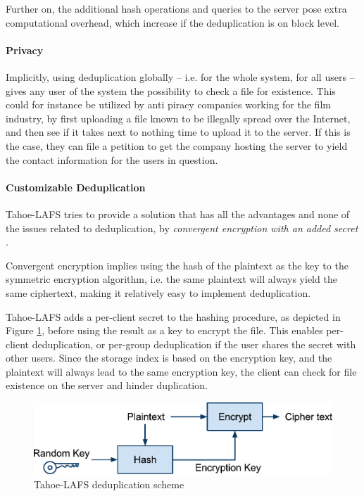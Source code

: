\documentclass[pdftex,english,10pt,b5paper,twoside]{book}
\begin{document}
Further on, the additional hash operations and queries to the server pose
extra computational overhead, which increase if the deduplication is on block
level.

\paragraph{Privacy} Implicitly, using deduplication globally -- i.e. for the
whole system, for all users -- gives any user of the system the possibility to
check a file for existence. This could for instance be utilized by anti piracy
companies working for the film industry, by first uploading a file known to be
illegally spread over the Internet, and then see if it takes next to nothing
time to upload it to the server. If this is the case, they can file a petition
to get the company hosting the server to yield the contact information for the
users in question.

\paragraph{Customizable Deduplication} Tahoe-\ac{LAFS} tries to provide a
solution that has all the advantages and none of the issues related to
deduplication, by \emph{convergent encryption with an added secret}
\cite{tahoe}.

Convergent encryption implies using the hash of the plaintext as the key to the
symmetric encryption algorithm, i.e. the same plaintext will always yield the
same ciphertext, making it relatively easy to implement deduplication.

Tahoe-\ac{LAFS} adds a per-client secret to the hashing procedure, as
depicted in Figure \ref{fig:tahoe:dedup}, before using the result as a key to
encrypt the file. This enables per-client deduplication, or per-group
deduplication if the user shares the secret with other users. Since the storage
index is based on the encryption key, and the plaintext will always lead to the
same encryption key, the client can check for file existence on the server and
hinder duplication.

\begin{figure}[!h]
    \centering
    \includegraphics[scale=0.55]{TahoeDeduplication.pdf}
    \caption{Tahoe-LAFS deduplication scheme}
    \label{fig:tahoe:dedup}
\end{figure}
\end{document}
